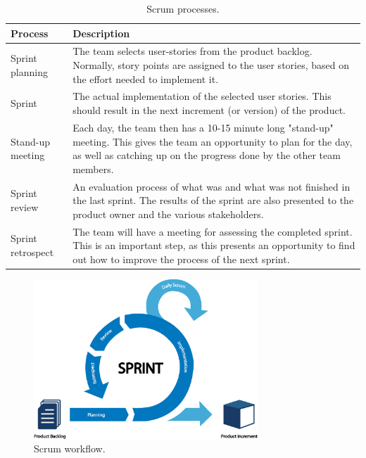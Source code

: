 \begin{table}[H]
    \centering
    \caption{Scrum processes.}
    \label{tab:scrum-processes}
    \begin{tabularx}{\textwidth}{|l|X|}
        \hline
        \textbf{Process} & \textbf{Description}\\
        \hline
        Sprint planning & The team selects user-stories from the product backlog. Normally, story points are assigned to the user stories, based on the effort needed to implement it.\\
        \hline
        Sprint & The actual implementation of the selected user stories. This should result in the next increment (or version) of the product.\\
        \hline
        Stand-up meeting & Each day, the team then has a 10-15 minute long "stand-up" meeting. This gives the team an opportunity to plan for the day, as well as catching up on the progress done by the other team members.\\
        \hline
        Sprint review& An evaluation process of what was and what was not finished in the last sprint. The results of the sprint are also presented to the product owner and the various stakeholders.\\
        \hline
        Sprint retrospect & The team will have a meeting for assessing the completed sprint. This is an important step, as this presents an opportunity to find out how to improve the process of the next sprint.\\
        \hline
    \end{tabularx}
\end{table}

\begin{figure}[ht]
    \centering
    \includegraphics[page=1,width=0.75\textwidth]{sections/theory/figures/scrum.eps}
    \caption{Scrum workflow.}
    \label{fig:scrum}
\end{figure}

